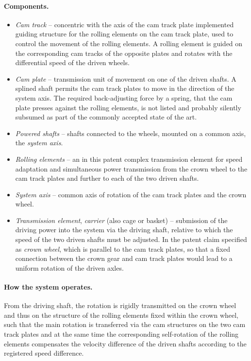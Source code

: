 \documentclass[11pt,a4paper]{article}
\begin{document}
\paragraph{Components.}
\begin{itemize}
\item \emph{Cam track} -- concentric with the axis of the cam track plate
  implemented guiding structure for the rolling elements on the cam track
  plate, used to control the movement of the rolling elements. A rolling
  element is guided on the corresponding cam tracks of the opposite plates and
  rotates with the differential speed of the driven wheels.
\item \emph{Cam plate} -- transmission unit of movement on one of the driven
  shafts. A splined shaft permits the cam track plates to move in the
  direction of the system axis.  The required back-adjusting force by a
  spring, that the cam plate presses against the rolling elements, is not
  listed and probably silently subsumed as part of the commonly accepted state
  of the art.
\item \emph{Powered shafts} -- shafts connected to the wheels, mounted on a
  common axis, the \emph{system axis}.
\item \emph{Rolling elements} -- an in this patent complex transmission
  element for speed adaptation and simultaneous power transmission from the
  crown wheel to the cam track plates and further to each of the two driven
  shafts.
\item \emph{System axis} -- common axis of rotation of the cam track plates
  and the crown wheel.
\item \emph{Transmission element}, \emph{carrier} (also cage or basket) --
  submission of the driving power into the system via the driving shaft,
  relative to which the speed of the two driven shafts must be adjusted. In
  the patent claim specified as \emph{crown wheel}, which is parallel to the
  cam track plates, so that a fixed connection between the crown gear and cam
  track plates would lead to a uniform rotation of the driven axles.
\end{itemize}

\paragraph{How the system operates.}
From the driving shaft, the rotation is rigidly transmitted on the crown wheel
and thus on the structure of the rolling elements fixed within the crown
wheel, such that the main rotation is transferred via the cam structures on
the two cam track plates and at the same time the corresponding self-rotation
of the rolling elements compensates the velocity difference of the driven
shafts according to the registered speed difference.
\end{document}
